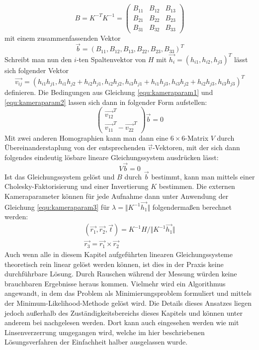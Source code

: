 \begin{equation}
	B = K^{-T}K^{-1} = \begin{pmatrix}
			B_{11} & B_{12} & B_{13} \\
			B_{21} & B_{22} & B_{23} \\
			B_{31} & B_{32} & B_{33}
		\end{pmatrix}
\end{equation}
mit einem zusammenfassenden Vektor
\begin{equation}
	\vec{b} = \left( B_{11}, B_{12}, B_{13}, B_{22}, B_{23}, B_{33} \right)^T
\end{equation}
Schreibt man nun den \(i\)-ten Spaltenvektor von \(H\) mit \(\vec{h_i} = \left( h_{i1}, h_{i2}, h_{j3} \right)^T\) lässt sich folgender Vektor 
\begin{equation}
	\vec{v_{ij}} = \left( h_{i1}h_{j1}, h_{i1}h_{j2}+h_{i2}h_{j1}, h_{i2}h_{j2},h_{i3}h_{j1}+h_{i1}h_{j3}, h_{i3}h_{j2}+h_{i2}h_{j3},h_{i3}h_{j3}\right)^T
\end{equation}
definieren. Die Bedingungen aus Gleichung \ref{equ:kameraparam1} und \ref{equ:kameraparam2} lassen sich dann in folgender Form aufstellen:
\begin{equation}
	\left( \begin{array}{c}\vec{v_{12}}^T\\\vec{v_{11}}^T - \vec{v_{22}}^T\end{array} \right)\vec{b} = 0
\end{equation}
Mit zwei anderen Homographien kann man dann eine \(6 \times 6\)-Matrix \(V\) durch Übereinanderstaplung von der entsprechenden \(\vec{v}\)-Vektoren, mit der sich dann folgendes eindeutig lösbare lineare Gleichungssystem ausdrücken lässt:
\begin{equation}
	V\vec{b} = 0
\end{equation}
Ist das Gleichungssystem gelöst und \(B\) durch \(\vec{b}\) bestimmt, kann man mittels einer Cholesky-Faktorisierung und einer Invertierung \(K\) bestimmen. Die externen Kameraparameter können für jede Aufnahme dann unter Anwendung der Gleichung \ref{equ:kameraparam3} für \(\lambda = \Vert K^{-1}\vec{h_1} \Vert\) folgendermaßen berechnet werden:
\begin{gather}
	\left(\vec{r_1},\vec{r_2},\vec{t}\right) = K^{-1}H \slash \Vert K^{-1}\vec{h_1} \Vert \\
	\vec{r_3} = \vec{r_1} \times \vec{r_2}
\end{gather}
Auch wenn alle in diesem Kapitel aufgeführten linearen Gleichungssysteme theoretisch rein linear gelöst werden können, ist dies in der Praxis keine durchführbare Lösung. Durch Rauschen während der Messung würden keine brauchbaren Ergebnisse heraus kommen. Vielmehr wird ein Algorithmus angewandt, in dem das Problem als Minimierungsproblem formuliert und mittels der Minimum-Likelihood-Methode gelöst wird. Die Details dieses Ansatzes liegen jedoch außerhalb des Zuständigkeitsbereichs dieses Kapitels und können unter anderem bei \cite{Zhang:00} nachgelesen werden. Dort kann auch eingesehen werden wie mit Linsenverzerrung umgegangen wird, welche im hier beschriebenen Lösungsverfahren der Einfachheit halber ausgelassen wurde.

